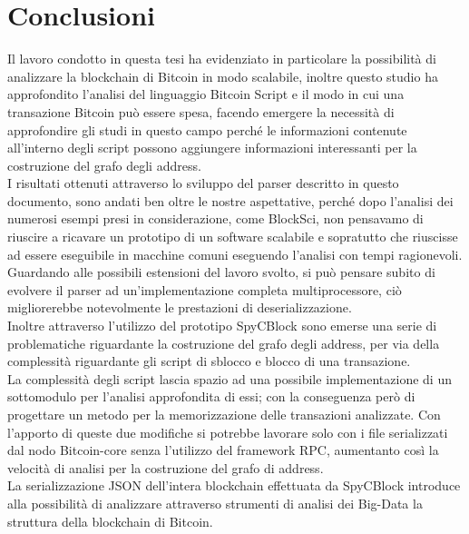 \chapter{Conclusioni}\label{chap:conclusioni}

Il lavoro condotto in questa tesi ha evidenziato in particolare la possibilità di analizzare la blockchain di Bitcoin in modo scalabile, inoltre questo studio ha approfondito l'analisi del linguaggio Bitcoin Script e il modo in cui una transazione Bitcoin può essere spesa, facendo emergere la necessità di approfondire gli studi in questo campo perché le informazioni contenute all'interno degli script possono aggiungere informazioni interessanti per la costruzione del grafo degli address.\\
I risultati ottenuti attraverso lo sviluppo del parser descritto in questo documento, sono andati ben oltre le nostre aspettative, perché dopo l'analisi dei numerosi esempi presi in considerazione, come BlockSci, non pensavamo di riuscire a ricavare un prototipo di un software scalabile e sopratutto che riuscisse ad essere eseguibile in macchine comuni eseguendo l'analisi con tempi ragionevoli.\\
Guardando alle possibili estensioni del lavoro svolto, si può pensare subito di evolvere il parser ad un'implementazione completa multiprocessore, ciò migliorerebbe notevolmente le prestazioni di deserializzazione.\\
Inoltre attraverso l'utilizzo del prototipo SpyCBlock sono emerse una serie di problematiche riguardante la costruzione del grafo degli address, per via della complessità riguardante gli script di sblocco e blocco di una transazione.\\
La complessità degli script lascia spazio ad una possibile implementazione di un sottomodulo per l'analisi approfondita di essi; con la conseguenza però di progettare un metodo per la memorizzazione delle transazioni analizzate. Con l'apporto di queste due modifiche si potrebbe lavorare solo con i file serializzati dal nodo Bitcoin-core senza l'utilizzo del framework RPC, aumentanto così la velocità di analisi per la costruzione del grafo di address.\\
La serializzazione JSON dell'intera blockchain effettuata da SpyCBlock introduce alla possibilità di analizzare attraverso strumenti di analisi dei Big-Data la struttura della blockchain di Bitcoin.
